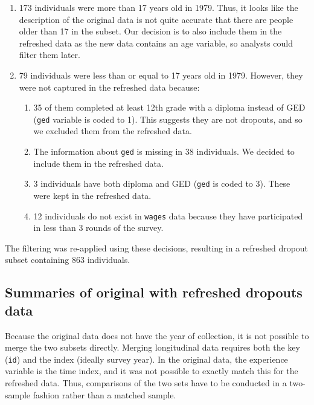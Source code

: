 \documentclass[12pt]{article}
\providecommand{\tightlist}{%
  \setlength{\itemsep}{0pt}\setlength{\parskip}{0pt}}
\begin{document}
\begin{enumerate}
\def\labelenumi{\arabic{enumi}.}
\tightlist
\item
  173 individuals were more than 17 years old in 1979. Thus, it looks like the description of the original data is not quite accurate that there are people older than 17 in the subset. Our decision is to also include them in the refreshed data as the new data contains an age variable, so analysts could filter them later.
\item
  79 individuals were less than or equal to 17 years old in 1979. However, they were not captured in the refreshed data because:

  \begin{enumerate}
  \def\labelenumii{\roman{enumii}.}
  \tightlist
  \item
    35 of them completed at least 12th grade with a diploma instead of GED (\texttt{ged} variable is coded to 1). This suggests they are not dropouts, and so we excluded them from the refreshed data.
  \item
    The information about \texttt{ged} is missing in 38 individuals. We decided to include them in the refreshed data.
  \item
    3 individuals have both diploma and GED (\texttt{ged} is coded to 3). These were kept in the refreshed data.
  \item
    12 individuals do not exist in \texttt{wages} data because they have participated in less than 3 rounds of the survey.
  \end{enumerate}
\end{enumerate}

The filtering was re-applied using these decisions, resulting in a refreshed dropout subset containing 863 individuals.

\hypertarget{summaries-of-original-with-refreshed-dropouts-data}{%
\subsection{Summaries of original with refreshed dropouts data}\label{summaries-of-original-with-refreshed-dropouts-data}}

Because the original data does not have the year of collection, it is not possible to merge the two subsets directly. Merging longitudinal data requires both the key (\texttt{id}) and the index (ideally survey year). In the original data, the experience variable is the time index, and it was not possible to exactly match this for the refreshed data. Thus, comparisons of the two sets have to be conducted in a two-sample fashion rather than a matched sample.
\end{document}
